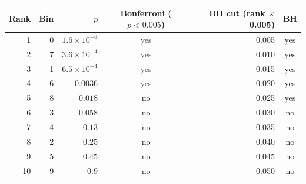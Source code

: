 \begin{tabular}{@{}rrrcrc@{}}
\toprule
Rank & Bin & $p$ & Bonferroni ($p<0.005$) & BH cut (rank $\times$ 0.005) & BH \\
\midrule
1 & 0 & $1.6\times10^{-6}$ & yes & 0.005 & yes \\
\midrule
2 & 7 & $3.6\times10^{-4}$ & yes & 0.010 & yes \\
\midrule
3 & 1 & $6.5\times10^{-4}$ & yes & 0.015 & yes \\
\midrule
4 & 6 & $0.0036$ & yes & 0.020 & yes \\
\midrule
5 & 8 & $0.018$ & no & 0.025 & yes \\
\midrule
6 & 3 & $0.058$ & no & 0.030 & no \\
\midrule
7 & 4 & $0.13$ & no & 0.035 & no \\
\midrule
8 & 2 & $0.25$ & no & 0.040 & no \\
\midrule
9 & 5 & $0.45$ & no & 0.045 & no \\
\midrule
10 & 9 & $0.9$ & no & 0.050 & no \\
\bottomrule
\end{tabular}
